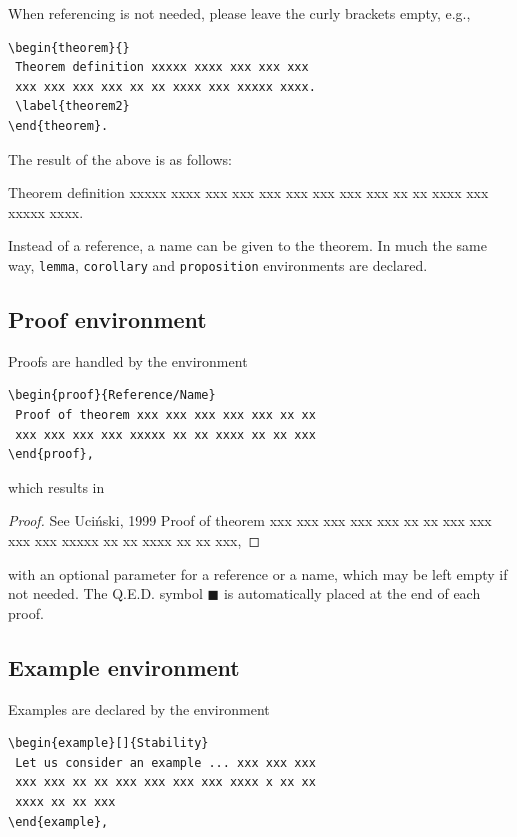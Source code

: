 \documentclass{amcs}
\begin{document}
\medskip\noindent
When referencing is not needed, please leave the curly brackets empty, e.g.,
{\small \begin{verbatim}
\begin{theorem}{}
 Theorem definition xxxxx xxxx xxx xxx xxx
 xxx xxx xxx xxx xx xx xxxx xxx xxxxx xxxx.
 \label{theorem2}
\end{theorem}.
\end{verbatim}}

\noindent
The result of the above is as follows:

\begin{theorem}{}
 Theorem definition xxxxx xxxx xxx xxx xxx
 xxx xxx xxx xxx xx xx xxxx xxx xxxxx xxxx.
 \label{theorem2}
\end{theorem}

\medskip \noindent

Instead of a reference, a name can be given to the theorem. In much the same way, \verb+lemma+, \verb+corollary+ and \verb+proposition+ environments are declared.

\subsection{Proof environment}
Proofs are handled by the environment
{\small \begin{verbatim}
\begin{proof}{Reference/Name}
 Proof of theorem xxx xxx xxx xxx xxx xx xx
 xxx xxx xxx xxx xxxxx xx xx xxxx xx xx xxx
\end{proof},
\end{verbatim}}

\noindent which results in

\begin{proof}{See Uci\'nski, 1999}
 Proof of theorem xxx xxx xxx xxx xxx xx xx
 xxx xxx xxx xxx xxxxx xx xx xxxx xx xx xxx,
\end{proof}

\medskip

\noindent with an optional parameter for a reference or a name, which may be left empty if not needed. The Q.E.D. symbol {\footnotesize $\blacksquare$} is automatically placed at the end of each proof.

\subsection{Example environment}
Examples are declared by the environment
{\small \begin{verbatim}
\begin{example}[]{Stability}
 Let us consider an example ... xxx xxx xxx
 xxx xxx xx xx xxx xxx xxx xxx xxxx x xx xx
 xxxx xx xx xxx
\end{example},
\end{verbatim}}
\end{document}
